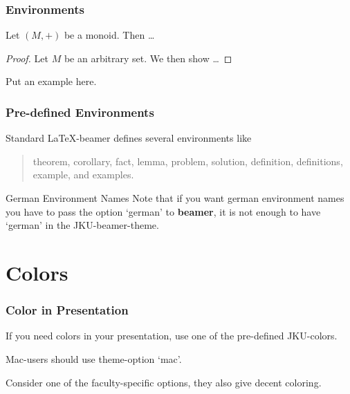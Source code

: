 \documentclass[aspectratio=169]{beamer}
\begin{document}
\begin{frame}
\frametitle{Environments}

\begin{theorem}
 Let $(M,+)$ be a monoid. Then \ldots
\end{theorem}

\begin{proof}
 Let $M$ be an arbitrary set. We then show \ldots
\end{proof}

\begin{example}
 Put an example here.
\end{example}

\end{frame}

\begin{frame}[fragile]
\frametitle{Pre-defined Environments}

 Standard \LaTeX-beamer defines several environments like
 \begin{quote}
  theorem, corollary, fact, lemma, problem, solution, definition, definitions,
  example, and examples.
 \end{quote}

 \begin{alertblock}{German Environment Names}
  Note that if you want german environment names you have to pass the option `german' to \textbf{beamer}, it is not enough to have `german' in the JKU-beamer-theme.
 \end{alertblock}

\end{frame}

\section{Colors}

\begin{frame}
 \frametitle{Color in Presentation}

If you need colors in your presentation, use one of the pre-defined JKU-colors. 

Mac-users should use theme-option `mac'.

Consider one of the faculty-specific options, they also give decent coloring.
 
\end{frame}
\end{document}
